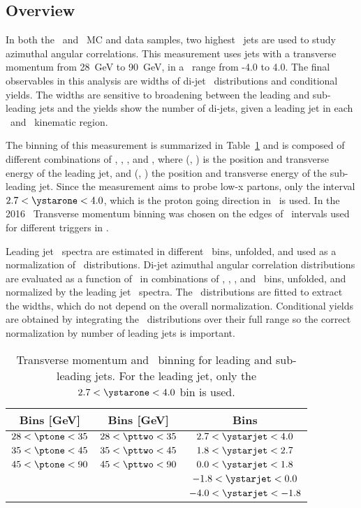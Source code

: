 \subsection{Overview}

In both the \pp\ and \pPb\ MC and data samples, two highest \pt\ jets are used to study azimuthal angular correlations. This measurement uses jets with a transverse momentum from 28~GeV to 90~GeV, in a \ystar\ range from -4.0 to 4.0. The final observables in this analysis are widths of di-jet \Dphi\ distributions and conditional yields. The widths are sensitive to broadening between the leading and sub-leading jets and the yields show the number of di-jets, given a leading jet in each \pT\ and \ystar\ kinematic region. 

The binning of this measurement is summarized in  Table~\ref{tab:binning} and is composed of different combinations of \ystarone, \ystartwo, \ptone, and \pttwo, where (\ystarone, \ptone) is the position and transverse energy of the leading jet, and (\ystartwo, \pttwo) the position and transverse energy of the sub-leading jet. Since the measurement aims to probe low-x partons, only the interval $2.7<\ystarone<4.0$, which is the proton going direction in \pPb\ is used. In the 2016 \pPb\ Transverse momentum binning was chosen on the edges of \pt\ intervals used for different triggers in \pp. 

Leading jet \ptone\ spectra are estimated in different \ystarone\ bins, unfolded, and used as a normalization of \Dphi\ distributions. Di-jet azimuthal angular correlation distributions are evaluated as a function of \Dphi\ in combinations of \ystarone, \ystartwo, \ptone, and \pttwo\ bins, unfolded, and normalized by the leading jet \pt\ spectra. The \Dphi\ distributions are fitted to extract the widths, which do not depend on the overall normalization. Conditional yields are obtained by integrating the \Dphi\ distributions over their full range so the correct normalization by number of leading jets is important. 

\begin{table}
	\centering
	\begin{tabular}{|| c | c | c || } 
		\hline
		\ptone Bins [GeV] & \pttwo Bins [GeV] & \ystartwo Bins \\ 
		\hline
		$28<\ptone<35$   & $28<\pttwo<35$  & $2.7<\ystarjet<4.0$ \\ 
		$35<\ptone<45$   & $35<\pttwo<45$  & $1.8<\ystarjet<2.7$ \\ 
		$45<\ptone<90$   & $45<\pttwo<90$  & $0.0<\ystarjet<1.8$ \\
						 & 				   & $-1.8<\ystarjet<0.0$ \\
						 &				   & $-4.0<\ystarjet<-1.8$ \\
		\hline
	\end{tabular}
	\caption{\label{tab:binning} Transverse momentum and \ystar\ binning for leading and sub-leading jets. For the leading jet, only the $2.7<\ystarone<4.0$ bin is used. }
\end{table}

